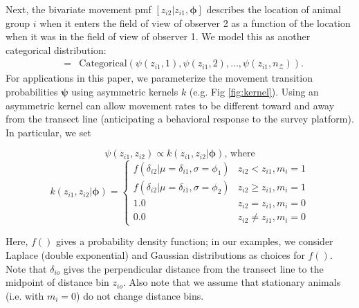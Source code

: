 \documentclass[aoas,preprint]{imsart}
\numberwithin{equation}{section}
\theoremstyle{plain}
\begin{document}
Next, the bivariate movement pmf $[z_{i2}|z_{i1},\boldsymbol{\phi}]$ describes the location of animal group $i$ when it enters the field of view of observer 2 as a function of the location when it was in the field of view of observer 1.  We model this as another categorical distribution:
\begin{eqnarray}
  [z_{i2}|z_{i1},\boldsymbol{\phi}] & = & \text{Categorical} \left( \psi(z_{i1},1),\psi(z_{i1},2),\hdots,\psi(z_{i1},n_\mathcal{Z}) \right).
  \label{eqn:move}
\end{eqnarray}
For applications in this paper, we parameterize the movement transition probabilities $\boldsymbol{\psi}$ using asymmetric kernels $k$ (e.g. Fig \ref{fig:kernel}).  Using an asymmetric kernel can allow movement rates to be different toward and away from the transect line (anticipating a behavioral response to the survey platform). In particular, we set
\begin{linenomath*}
\begin{equation}
  \psi(z_{i1},z_{i2}) \propto k(z_{i1},z_{i2}|\boldsymbol{\phi}) \text{, where}
  \label{eq:psi}
\end{equation}
\begin{equation}
  k(z_{i1},z_{i2}|\boldsymbol{\phi}) = \left\{ \begin{array}{rl}
                                    f(\delta_{i2}|\mu=\delta_{i1},\sigma=\phi_1) & z_{i2}<z_{i1}, m_i = 1 \\
                                    f(\delta_{i2}|\mu=\delta_{i1},\sigma=\phi_2) & z_{i2} \ge z_{i1}, m_i = 1  \\
                                    1.0 & z_{i2}=z_{i1}, m_i=0 \\
                                    0.0 & z_{i2} \ne z_{i1}, m_i=0
                                    \end{array} \right.
  \label{eq:g}
\end{equation}
\end{linenomath*}
Here, $f()$ gives a probability density function; in our examples, we consider Laplace (double exponential) and Gaussian distributions as choices for $f()$. Note that $\delta_{io}$ gives the perpendicular distance from the transect line to the midpoint of distance bin $z_{io}$.  Also note that we assume that stationary animals (i.e. with $m_i=0$) do not change distance bins.
\end{document}
